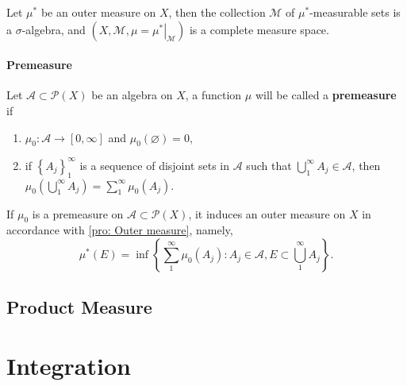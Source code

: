 \documentclass[12pt, a4paper, oneside]{book}
\begin{document}
\begin{theorem}
    Let $\mu^*$ be an outer measure on $X$, then the collection $\mathcal{M}$ of $\mu^*$-measurable sets is a $\sigma$-algebra, and $\left(X,\mathcal{M},\mu=\left.\mu^*\right|_{\mathcal{M}}\right)$ is a complete measure space.
\end{theorem}



\subsubsection{Premeasure}

\begin{definition}
    Let $\mathcal{A} \subset \mathcal{P}(X)$ be an algebra on $X$, a function $\mu$ will be called a \textbf{premeasure} if
    \begin{enumerate}
        \item
              $\mu_0: \mathcal{A} \rightarrow[0, \infty]$ and $\mu_0(\varnothing)=0$,
        \item
              if $\left\{A_j\right\}_1^{\infty}$ is a sequence of disjoint sets in $\mathcal{A}$ such that $\bigcup_1^{\infty} A_j \in \mathcal{A}$, then $\mu_0\left(\bigcup_1^{\infty} A_j\right)=\sum_1^{\infty} \mu_0\left(A_j\right)$.
    \end{enumerate}
    If $\mu_0$ is a premeasure on $\mathcal{A} \subset \mathcal{P}(X)$, it induces an outer measure on $X$ in accordance with \ref{pro: Outer measure}, namely,
    \begin{equation*}
        \mu^*(E)=\inf \left\{\sum_1^{\infty} \mu_0\left(A_j\right): A_j \in \mathcal{A}, E \subset \bigcup_1^{\infty} A_j\right\} .
    \end{equation*}
\end{definition}





\section{Product Measure} %













\chapter{Integration} %
\end{document}
